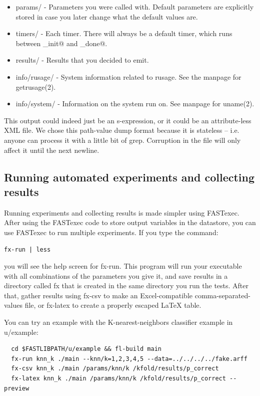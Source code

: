 \documentclass[letter]{report}
\begin{document}
\begin{itemize}
\item params/ - Parameters you were called with. Default parameters are explicitly stored in case you later change what the default values are.
\item timers/ - Each timer. There will always be a default timer, which runs between \verb@fx_init@ and \verb@fx_done@.
\item results/ - Results that you decided to emit.
\item info/rusage/ - System information related to rusage. See the manpage for getrusage(2).
\item info/system/ - Information on the system run on. See manpage for uname(2). 
\end{itemize}
This output could indeed just be an s-expression, or it could be an attribute-less XML file. We chose this path-value dump format because it is stateless -- i.e. anyone can process it with a little bit of grep. Corruption in the file will only affect it until the next newline.

\subsection{Running automated experiments and collecting results}

Running experiments and collecting results is made simpler using FASTexec. After using the FASTexec code to store output variables in the datastore, you can use FASTexec to run multiple experiments. If you type the command:
\begin{verbatim}
fx-run | less
\end{verbatim}
you will see the help screen for fx-run. This program will run your executable with all combinations of the parameters you give it, and save results in a directory called fx that is created in the same directory you run the tests. After that, gather results using fx-csv to make an Excel-compatible comma-separated-values file, or fx-latex to create a properly escaped LaTeX table.

You can try an example with the K-nearest-neighbors classifier example in u/example:
\begin{verbatim}
  cd $FASTLIBPATH/u/example && fl-build main
  fx-run knn_k ./main --knn/k=1,2,3,4,5 --data=../../../../fake.arff
  fx-csv knn_k ./main /params/knn/k /kfold/results/p_correct
  fx-latex knn_k ./main /params/knn/k /kfold/results/p_correct --preview
\end{verbatim}
\end{document}
